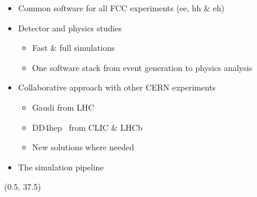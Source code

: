 \documentclass[final,xcolor={dvipsnames,svgnames,x11names,table}]{beamer}
\begin{document}
\begin{frame}
\begin{textblock}{39.5}
\begin{tcolorbox}[title=FCCSW: Physics and Detector simulations with FCCSW]
  \vspace{0.5cm}
  \begin{itemize}
    \item Common software for all FCC experiments (ee, hh \& eh)~\cite{FCCSW} \vspace{0.5cm}
    \item Detector and physics studies \vspace{0.5cm}
      \begin{itemize}
        \item Fast \& full simulations
        \item One software stack from event generation to physics analysis \vspace{0.5cm}
      \end{itemize}
    \item Collaborative approach with other CERN experiments \vspace{0.5cm}
      \begin{itemize}
        \item Gaudi from LHC~\cite{Gaudi}
        \item DD4hep~\cite{DD4hep} from CLIC \& LHCb
        \item New solutions where needed
      \end{itemize}
    \item The simulation pipeline
  \end{itemize}

  \vspace{0.5cm}

  \centering
     \vspace{0.2cm}
  \end{tcolorbox}
\end{textblock}

\begin{textblock}{83}(0.5, 37.5)
  \begin{tcolorbox}[title=The IDEA detector concept for FCC-ee]


\end{tcolorbox}
\end{textblock}
\end{frame}
\end{document}
